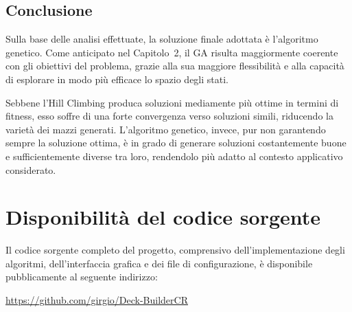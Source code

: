 \documentclass{article}
\begin{document}
\subsection{Conclusione}

Sulla base delle analisi effettuate, la soluzione finale adottata è l’algoritmo genetico.  
Come anticipato nel Capitolo~2, il GA risulta maggiormente coerente con gli obiettivi del problema, grazie alla sua maggiore flessibilità e alla capacità di esplorare in modo più efficace lo spazio degli stati.

Sebbene l’Hill Climbing produca soluzioni mediamente più ottime in termini di fitness, esso soffre di una forte convergenza verso soluzioni simili, riducendo la varietà dei mazzi generati.  
L’algoritmo genetico, invece, pur non garantendo sempre la soluzione ottima, è in grado di generare soluzioni costantemente buone e sufficientemente diverse tra loro, rendendolo più adatto al contesto applicativo considerato.

\section{Disponibilità del codice sorgente}

Il codice sorgente completo del progetto, comprensivo dell’implementazione degli algoritmi, dell’interfaccia grafica e dei file di configurazione, è disponibile pubblicamente al seguente indirizzo:

\begin{center}
\url{https://github.com/girgio/Deck-BuilderCR}
\end{center}
\end{document}
